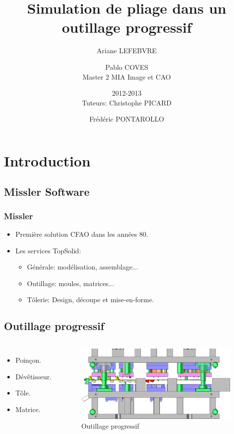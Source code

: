 \documentclass{beamer}
\title{Simulation de pliage dans un outillage progressif}
\author{Ariane LEFEBVRE \and Pablo COVES\\[.5cm] Master 2 MIA Image et CAO \and 2012-2013\\[.5cm] Tuteurs: Christophe PICARD \and Frédéric PONTAROLLO}
\date{}
\begin{document}
\maketitle

\section{Introduction}
\subsection{Missler Software}
\begin{frame}
    \frametitle{Missler}
    \begin{itemize}
        \item Première solution CFAO dans les années 80.
        \item Les services TopSolid:
            \begin{itemize}
                \item Générale: modélisation, assemblage...
                \item Outillage: moules, matrices...
                \item Tôlerie: Design, découpe et mise-en-forme.
            \end{itemize}
    \end{itemize}
\end{frame}
\subsection{Outillage progressif}
\begin{frame}
    \begin{columns}
        \begin{itemize}
            \item Poinçon.
            \item Dévêtisseur.
            \item Tôle.
            \item Matrice.
        \end{itemize}
        \begin{figure}
            \includegraphics[width=\textwidth]{img/dieTool.jpg}
            \caption{Outillage progressif}
        \end{figure}
    \end{columns}
\end{frame}
\end{document}

